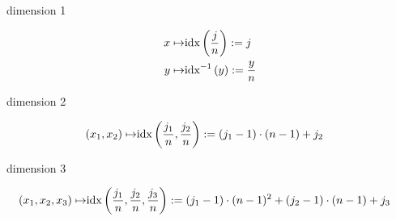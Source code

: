 dimension 1

\begin{align*}
    x \mapsto& \text{idx} \left( \frac{j}{n} \right) := j \\
    y \mapsto& \text{idx}^{-1} \left( y \right) := \frac{y}{n}
\end{align*}

dimension 2

\begin{align*}
    (x_1, x_2) \mapsto& \text{idx} \left( \frac{j_1}{n}, \frac{j_2}{n} \right) := (j_1 - 1) \cdot (n - 1) + j_2
\end{align*}

dimension 3

\begin{align*}
    (x_1, x_2, x_3) \mapsto& \text{idx} \left( \frac{j_1}{n}, \frac{j_2}{n}, \frac{j_3}{n} \right) := (j_1 - 1) \cdot (n - 1)^2 + (j_2 - 1) \cdot (n - 1) + j_3
\end{align*}
